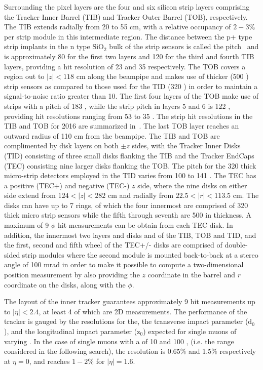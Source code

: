 Surrounding the pixel layers are the four and six silicon strip layers comprising the Tracker Inner Barrel (TIB) and Tracker Outer Barrel (TOB), respectively. The TIB extends radially from 20 to 55 cm, with a relative occupancy of $2-3\%$ per strip module in this intermediate region. The distance between the p+ type strip implants in the n type $\textrm{SiO}_{2}$ bulk of the strip sensors is called the pitch~\cite{Borrello:2003uza} and is approximately 80 \mum for the first two layers and 120 \mum for the third and fourth TIB layers, providing a hit resolution of 23 \mum and 35 \mum respectively. The TOB covers a region out to $|z|<118$ cm along the beampipe and makes use of thicker (500 \mum) strip sensors as compared to those used for the TID (320 \mum) in order to maintain a signal-to-noise ratio greater than 10. The first four layers of the TOB make use of strips with a pitch of 183 \mum, while the strip pitch in layers 5 and 6 is 122 \mum, providing hit resolutions ranging from 53 \mum to 35 \mum. The strip hit resolutions in the TIB and TOB for 2016 are summarized in~. The last TOB layer reaches an outward radius of 110 cm from the beampipe. The TIB and TOB are complimented by disk layers on both $\pm z$ sides, with the Tracker Inner Disks (TID) consisting of three small disks flanking the TIB and the Tracker EndCaps (TEC) consisting nine larger disks flanking the TOB. The pitch for the 320 \mum thick micro-strip detectors employed in the TID varies from 100 \mum to 141 \mum. The TEC has a positive (TEC+) and negative (TEC-) $z$ side, where the nine disks on either side extend from $124 < |z| < 282$ cm and radially from $22.5 < |r| < 113.5$ cm. The disks can have up to 7 rings, of which the four innermost are comprised of 320 \mum thick micro strip sensors while the fifth through seventh are 500 \mum in thickness. A maximum of 9 $\phi$ hit measurements can be obtain from each TEC disk. In addition, the innermost two layers and disks and of the TIB, TOB and TID, and the first, second and fifth wheel of the TEC+/- disks are comprised of double-sided strip modules where the second module is mounted back-to-back at a stereo angle of 100 mrad in order to make it possible to compute a two-dimensional position measurement by also providing the $z$ coordinate in the barrel and $r$ coordinate on the disks, along with the $\phi$.

The layout of the inner tracker guarantees approximately 9 hit measurements up to $|\eta| < 2.4$, at least 4 of which are 2D measurements. The performance of the tracker is gauged by the resolutions for the\pt, the transverse impact parameter ($\textrm{d}_0$), and the longitudinal impact parameter ($\textrm{z}_0$) expected for single muons of varying \pt. In the case of single muons with a \pt of 10 and 100 \GeV, (i.e. the range considered in the following search), the \pt resolution is 0.65$\%$ and 1.5$\%$ respectively at $\eta=0$, and reaches $1-2\%$ for $|\eta|=1.6$.

